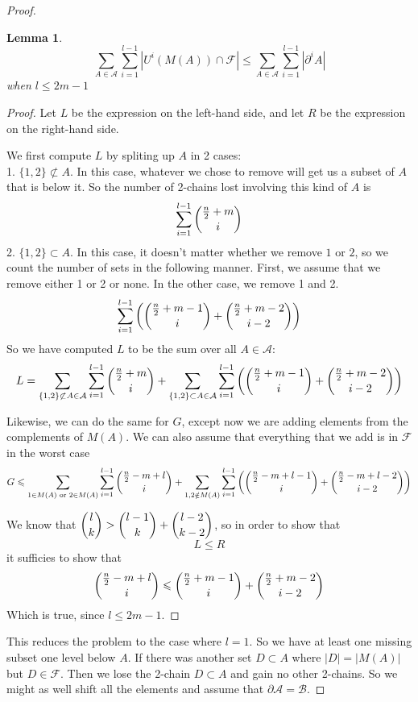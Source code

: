 \documentclass[12pt]{article}
\theoremstyle{plain}
\newtheorem{lemma}[theorem]{Lemma}
\theoremstyle{definition}
\theoremstyle{remark}
\newcommand{\F}{\mathcal{F}}
\newcommand{\A}{\mathcal{A}}
\newcommand{\B}{\mathcal{B}}
\begin{document}
\begin{proof}
\begin{lemma} 
\label{lemma1}
\[ \sum_{A\in \A}\sum_{i = 1}^{l-1} |U^i(M(A)) \cap \F| \leq \sum_{A \in \A}\sum_{i = 1}^{l-1} |\partial^i A | \]
when $l \leq 2m-1$
\end{lemma}

\begin{proof}
Let $L$ be the expression on the left-hand side, and let $R$ be the expression on the right-hand side.

We first compute $L$ by spliting up $A$ in 2 cases:\\
1. $\{ 1, 2 \} \not\subset A$. In this case, whatever we chose to remove will get us a subset of $A$ that is below it. So the number of 2-chains lost involving this kind of $A$ is
\[ \sum_{i=1}^{l-1} \dbinom{\frac{n}{2} + m}{i} \]
2. $\{ 1, 2 \} \subset A$. In this case, it doesn't matter whether we remove $1$ or $2$, so we count the number of sets in the following manner. First, we assume that we remove either 1 or 2 or none. In the other case, we remove 1 and 2.
\[ \sum_{i=1}^{l-1} \left(\dbinom{\frac{n}{2} + m - 1}{i} + \dbinom{\frac{n}{2}+m-2}{i-2} \right) \]
So we have computed $L$ to be the sum over all $A \in \A$:
\[ L = \sum_{\{1, 2\} \not\subset A \in \A} \sum_{i=1}^{l-1} \dbinom{\frac{n}{2} + m}{i} + \sum_{\{1, 2\} \subset A \in \A} \sum_{i=1}^{l-1} \left( \dbinom{\frac{n}{2}+m-1}{i} + \dbinom{\frac{n}{2}+m-2}{i-2}\right) \]

Likewise, we can do the same for $G$, except now we are adding elements from the complements of $M(A)$. We can also assume that everything that we add is in $\F$ in the worst case
\[ G \leq \sum_{1 \in M(A) \text{ or } 2 \in M(A)} \sum_{i=1}^{l-1} \dbinom{\frac{n}{2}-m+l}{i} + \sum_{1, 2 \notin M(A)} \sum_{i=1}^{l-1} \left( \dbinom{\frac{n}{2}-m+l-1}{i} + \dbinom{\frac{n}{2}-m+l-2}{i-2} \right) \]

We know that $\dbinom{l}{k} > \dbinom{l-1}{k} + \dbinom{l-2}{k-2}$, so in order to show that 
\[ L \leq R \]
it sufficies to show that
\[ \dbinom{\frac{n}{2}-m+l}{i} \leq \dbinom{\frac{n}{2}+m-1}{i} + \dbinom{\frac{n}{2}+m-2}{i-2} \]
Which is true, since $l \leq 2m-1$.
\end{proof}

This reduces the problem to the case where $l=1$. So we have at least one missing subset one level below $A$. If there was another set $D \subset A$ where $|D| = |M(A)|$ but $D \in \F$. Then we lose the 2-chain $D \subset A$ and gain no other 2-chains. So we might as well shift all the elements and assume that $\partial \A = \B$. 


\end{proof}
\end{document}
